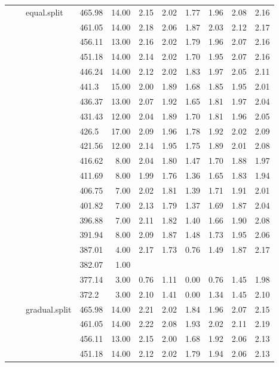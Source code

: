 \begin{longtable}{llllrrrrrrr}
   &  & equal.split & 465.98 & 14.00 & 2.15 & 2.02 & 1.77 & 1.96 & 2.08 & 2.16 \\ 
   &  &  & 461.05 & 14.00 & 2.18 & 2.06 & 1.87 & 2.03 & 2.12 & 2.17 \\ 
   &  &  & 456.11 & 13.00 & 2.16 & 2.02 & 1.79 & 1.96 & 2.07 & 2.16 \\ 
   &  &  & 451.18 & 14.00 & 2.14 & 2.02 & 1.70 & 1.95 & 2.07 & 2.16 \\ 
   &  &  & 446.24 & 14.00 & 2.12 & 2.02 & 1.83 & 1.97 & 2.05 & 2.11 \\ 
   &  &  & 441.3 & 15.00 & 2.00 & 1.89 & 1.68 & 1.85 & 1.95 & 2.01 \\ 
   &  &  & 436.37 & 13.00 & 2.07 & 1.92 & 1.65 & 1.81 & 1.97 & 2.04 \\ 
   &  &  & 431.43 & 12.00 & 2.04 & 1.89 & 1.70 & 1.81 & 1.96 & 2.05 \\ 
   &  &  & 426.5 & 17.00 & 2.09 & 1.96 & 1.78 & 1.92 & 2.02 & 2.09 \\ 
   &  &  & 421.56 & 12.00 & 2.14 & 1.95 & 1.75 & 1.89 & 2.01 & 2.08 \\ 
   &  &  & 416.62 & 8.00 & 2.04 & 1.80 & 1.47 & 1.70 & 1.88 & 1.97 \\ 
   &  &  & 411.69 & 8.00 & 1.99 & 1.76 & 1.36 & 1.65 & 1.83 & 1.94 \\ 
   &  &  & 406.75 & 7.00 & 2.02 & 1.81 & 1.39 & 1.71 & 1.91 & 2.01 \\ 
   &  &  & 401.82 & 7.00 & 2.13 & 1.79 & 1.37 & 1.69 & 1.87 & 2.04 \\ 
   &  &  & 396.88 & 7.00 & 2.11 & 1.82 & 1.40 & 1.66 & 1.90 & 2.08 \\ 
   &  &  & 391.94 & 8.00 & 2.09 & 1.87 & 1.48 & 1.73 & 1.95 & 2.06 \\ 
   &  &  & 387.01 & 4.00 & 2.17 & 1.73 & 0.76 & 1.49 & 1.87 & 2.17 \\ 
   &  &  & 382.07 & 1.00 &  &  &  &  &  &  \\ 
   &  &  & 377.14 & 3.00 & 0.76 & 1.11 & 0.00 & 0.76 & 1.45 & 1.98 \\ 
   &  &  & 372.2 & 3.00 & 2.10 & 1.41 & 0.00 & 1.34 & 1.45 & 2.10 \\ 
   &  & gradual.split & 465.98 & 14.00 & 2.21 & 2.02 & 1.84 & 1.96 & 2.07 & 2.15 \\ 
   &  &  & 461.05 & 14.00 & 2.22 & 2.08 & 1.93 & 2.02 & 2.11 & 2.19 \\ 
   &  &  & 456.11 & 13.00 & 2.15 & 2.00 & 1.68 & 1.92 & 2.06 & 2.13 \\ 
   &  &  & 451.18 & 14.00 & 2.12 & 2.02 & 1.79 & 1.94 & 2.06 & 2.13 \\ 

\end{longtable}
